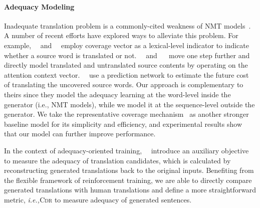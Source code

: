 \documentclass[letterpaper]{article} \usepackage{aaai19}  \usepackage{times}  \usepackage{helvet}  \usepackage{courier}  \usepackage{url}  \usepackage{graphicx}  \frenchspacing  \setlength{\pdfpagewidth}{8.5in}  \setlength{\pdfpageheight}{11in}  \usepackage{amsmath}
\begin{document}
\paragraph{Adequacy Modeling}
Inadequate translation problem is a commonly-cited weakness of NMT models~\cite{tu2016modeling}. A number of recent efforts have explored ways to alleviate this problem. For example,~\citeauthor{tu2016modeling}~ and~\citeauthor{Mi:2016:EMNLP}~ employ coverage vector as a lexical-level indicator to indicate whether a source word is translated or not.~\citeauthor{Zheng:2018:TACL}~ and ~\citeauthor{Meng:2018:IJCAI}~ move one step further and directly model translated and untranslated source contents by operating on the attention context vector.~\citeauthor{He:2017:NIPS}~ use a prediction network to estimate the future cost of translating the uncovered source words.
Our approach is complementary to theirs since they model the adequacy learning at the word-level inside the generator (i.e., NMT models), while we model it at the sequence-level outside the generator.
We take the representative coverage mechanism~\cite{tu2016modeling} as another stronger baseline model for its simplicity and efficiency, and experimental results show that our model can further improve performance.

In the context of adequacy-oriented training,~\citeauthor{Tu:2017:AAAI}~ introduce an auxiliary objective to measure the adequacy of translation candidates, which is calculated by reconstructing generated translations back to the original inputs. Benefiting from the flexible framework of reinforcement training, we are able to directly compare generated translations with human translations and define a more straightforward metric, \emph{i.e.,}\xspace \textsc{Cdr} to measure adequacy of generated sentences.
\end{document}
